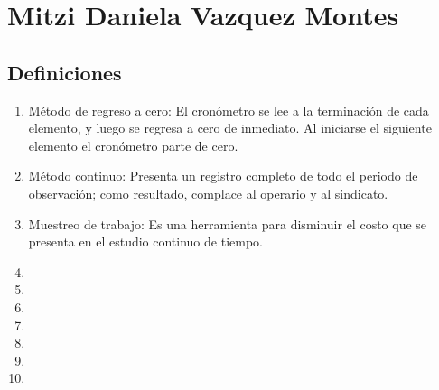 \section{Mitzi Daniela Vazquez Montes}
\subsection{Definiciones}
\begin{enumerate}
    \item Método de regreso a cero: El cronómetro se lee a la terminación de cada elemento, y luego se regresa a cero de inmediato. Al iniciarse el siguiente elemento el cronómetro parte de cero.
    \item Método continuo: Presenta un registro completo de todo el periodo de observación; como resultado, complace al operario y al sindicato.
    \item Muestreo de trabajo: Es una herramienta para disminuir el costo que se presenta en el estudio continuo de tiempo.
    \item 
    \item 
    \item 
    \item 
    \item 
    \item 
    \item 
    
\end{enumerate}
